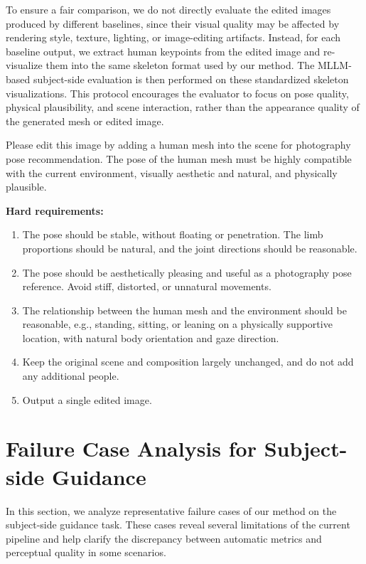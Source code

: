 \documentclass{llmxive}
\begin{document}
To ensure a fair comparison, we do not directly evaluate the edited images produced by different baselines, since their visual quality may be affected by rendering style, texture, lighting, or image-editing artifacts. Instead, for each baseline output, we extract human keypoints from the edited image and re-visualize them into the same skeleton format used by our method. The MLLM-based subject-side evaluation is then performed on these standardized skeleton visualizations. This protocol encourages the evaluator to focus on pose quality, physical plausibility, and scene interaction, rather than the appearance quality of the generated mesh or edited image.

\begin{promptbox}
\small

Please edit this image by adding a human mesh into the scene for photography pose recommendation. The pose of the human mesh must be highly compatible with the current environment, visually aesthetic and natural, and physically plausible.

\vspace{0.5em}
\noindent\textbf{Hard requirements:}
\begin{enumerate}
    \item The pose should be stable, without floating or penetration. The limb proportions should be natural, and the joint directions should be reasonable.
    \item The pose should be aesthetically pleasing and useful as a photography pose reference. Avoid stiff, distorted, or unnatural movements.
    \item The relationship between the human mesh and the environment should be reasonable, e.g., standing, sitting, or leaning on a physically supportive location, with natural body orientation and gaze direction.
    \item Keep the original scene and composition largely unchanged, and do not add any additional people.
    \item Output a single edited image.
\end{enumerate}
\end{promptbox}
\section{Failure Case Analysis for Subject-side Guidance}
\label{app:limitations}

In this section, we analyze representative failure cases of our method on the subject-side guidance task. These cases reveal several limitations of the current pipeline and help clarify the discrepancy between automatic metrics and perceptual quality in some scenarios.
\end{document}
